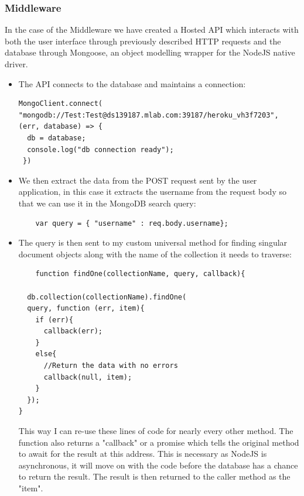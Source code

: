\subsubsection{Middleware}
    In the case of the Middleware we have created a Hosted API which interacts with both the user interface through previously described HTTP requests and the database through Mongoose, an object modelling wrapper for the NodeJS native driver. \cite{mongoose}
\begin{itemize}


    \item The API connects to the database and maintains a connection: 
\begin{verbatim}
MongoClient.connect(
"mongodb://Test:Test@ds139187.mlab.com:39187/heroku_vh3f7203",
(err, database) => {
  db = database;
  console.log("db connection ready");
 })
\end{verbatim}
    \item We then extract the data from the POST request sent by the user application, in this case it extracts the username from the request body so that we can use it in the MongoDB search query:
\begin{verbatim}
    var query = { "username" : req.body.username};
\end{verbatim}
    \item The query is then sent to my custom universal method for finding singular document objects along with the name of the collection it needs to traverse: 
\begin{verbatim}
    function findOne(collectionName, query, callback){

  db.collection(collectionName).findOne(
  query, function (err, item){
    if (err){
      callback(err);
    }
    else{
      //Return the data with no errors
      callback(null, item);
    }
  });
}
\end{verbatim}
    This way I can re-use these lines of code for nearly every other method. The function also returns a "callback" or a promise which tells the original method to await for the result at this address. This is necessary as NodeJS is asynchronous, it will move on with the code before the database has a chance to return the result.
    The result is then returned to the caller method as the "item".


\end{itemize}
